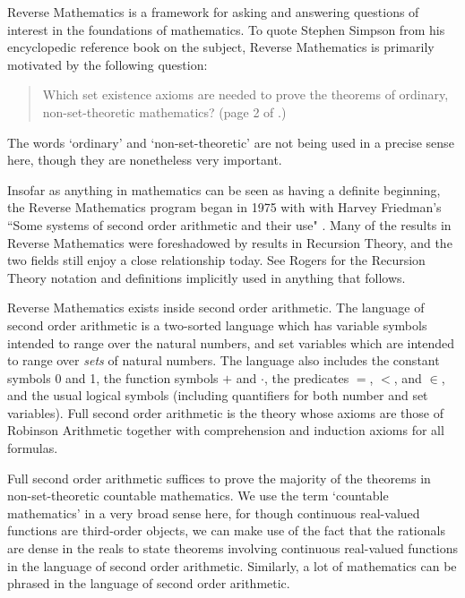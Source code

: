 Reverse Mathematics is a framework for asking and answering
questions of interest in the foundations of mathematics.
To quote Stephen Simpson from his encyclopedic reference book
on the subject, Reverse Mathematics is primarily motivated
by the following question:
\begin{quote}
Which set existence axioms are needed to
prove the theorems of ordinary, non-set-theoretic mathematics?
(page 2 of \cite{SOSOA}.)
\end{quote}
The words `ordinary' and `non-set-theoretic' are
not being used in a precise sense here,
though they are nonetheless very important.

Insofar as anything in mathematics can be seen as having
a definite beginning, the Reverse Mathematics program began
in 1975 with with Harvey Friedman's
``Some systems of second order arithmetic and their use"
\cite{Friedman:SomeSystems}.
Many of the results in Reverse Mathematics were foreshadowed
by results in Recursion Theory, and the two fields still
enjoy a close relationship today.
See Rogers \cite{Rogers} for the Recursion Theory notation
and definitions implicitly used in anything that follows.

Reverse Mathematics exists inside second order arithmetic.
The language of second order arithmetic is a two-sorted language
which has variable symbols intended to range over the natural numbers,
and set variables which are intended to range over \textit{sets} of natural numbers.
The language also includes the constant symbols 0 and 1, the function symbols
$+$ and $\cdot$, the predicates $=$, $<$, and $\in$, and the usual logical
symbols (including quantifiers for both number and set variables).
Full second order arithmetic is the theory whose axioms are those of
Robinson Arithmetic together with comprehension and induction axioms for all formulas.

Full second order arithmetic suffices to prove the majority
of the theorems in non-set-theoretic countable mathematics.
We use the term `countable mathematics' in a very broad sense
here, for though continuous real-valued functions are
third-order objects, we can make use of the fact that
the rationals are dense in the reals to state
theorems involving continuous real-valued functions in
the language of second order arithmetic.
Similarly, a lot of mathematics can be phrased
in the language of second order arithmetic.

